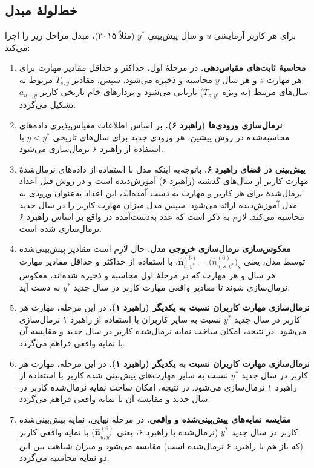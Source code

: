 \subsection{خط‌لولهٔ مبدل}
برای هر کاربر آزمایشی \(u\) و سال پیش‌بینی \(y^*\) (مثلاً ۲۰۱۵)، مبدل مراحل زیر را اجرا می‌کند:

\begin{enumerate}
  \item \textbf{محاسبهٔ ثابت‌های مقیاس‌دهی.} در مرحلهٔ اول، حداکثر و حداقل مقادیر مهارت برای هر مهارت \(s\) و هر سال \(y\) محاسبه و ذخیره می‌شود. سپس، مقادیر \(T_{s,y}\) مربوط به سال‌های مرتبط (به ویژه \(T_{s,y^*}\)) بازیابی می‌شود و بردارهای خام تاریخی کاربر \(a_{u,\cdot,y}\) تشکیل می‌گردد.
  \item \textbf{نرمال‌سازی ورودی‌ها (راهبرد ۶).} بر اساس اطلاعات مقیاس‌پذیری داده‌های محاسبه‌شده در روش پیشین، هر ورودی جدید برای سال‌های تاریخی \(y<y^*\) با استفاده از راهبرد ۶ نرمال‌سازی می‌شود.
  \item \textbf{پیش‌بینی در فضای راهبرد ۶.} باتوجه‌به اینکه مدل با استفاده از داده‌های نرمال‌شدهٔ مهارت کاربر از سال‌های گذشته (راهبرد ۶) آموزش‌دیده است و در روش قبل اعداد نرمال‌شدهٔ برای هر کاربر و مهارت به دست آمده‌اند، این اعداد به‌عنوان ورودی به مدل آموزش‌دیده ارائه می‌شود. سپس مدل میزان مهارت کاربر را در سال جدید محاسبه می‌کند. لازم به ذکر است که عدد به‌دست‌آمده در واقع بر اساس راهبرد ۶ نرمال‌سازی شده است.
  \item \textbf{معکوس‌سازی نرمال‌سازی خروجی مدل.} حال لازم است مقادیر پیش‌بینی‌شده توسط مدل، یعنی $\widehat{\mathbf{n}}^{(6)}_{u,y^*} = \bigl(\widehat{n}^{(6)}_{u,s,y^*}\bigr)_{s}$، با استفاده از حداکثر و حداقل مقادیر مهارت هر سال و هر مهارت که در مرحلهٔ اول محاسبه و ذخیره شده‌اند، معکوس نرمال‌سازی شوند تا مقادیر واقعی مهارت کاربر در سال جدید $y^*$ به دست آید.
  \item \textbf{نرمال‌سازی مهارت کاربران نسبت به یکدیگر (راهبرد ۱).} در این مرحله، مهارت هر کاربر در سال جدید $y^*$ نسبت به سایر کاربران با استفاده از راهبرد ۱ نرمال‌سازی می‌شود. در نتیجه، امکان ساخت نمایه نرمال‌شده کاربر در سال جدید و مقایسه آن با نمایه واقعی فراهم می‌گردد.\item \textbf{نرمال‌سازی مهارت کاربران نسبت به یکدیگر (راهبرد ۱).} در این مرحله، مهارت هر کاربر در سال جدید $y^*$ نسبت به سایر مهارت‌های پیش‌بینی شده کاربر با استفاده از راهبرد ۱ نرمال‌سازی می‌شود. در نتیجه، امکان ساخت نمایه نرمال‌شده کاربر در سال جدید و مقایسه آن با نمایه واقعی فراهم می‌گردد.
  \item \textbf{مقایسه نمایه‌های پیش‌بینی‌شده و واقعی.} در مرحله نهایی، نمایه پیش‌بینی‌شده کاربر در سال جدید $y^*$ (نرمال‌شده با راهبرد ۶، یعنی $\widehat{\mathbf{n}}^{(6)}_{u,y^*}$) با نمایه واقعی کاربر (که باز هم با راهبرد ۶ نرمال‌شده است) مقایسه می‌شود و میزان شباهت بین این دو نمایه محاسبه می‌گردد.
\end{enumerate}



